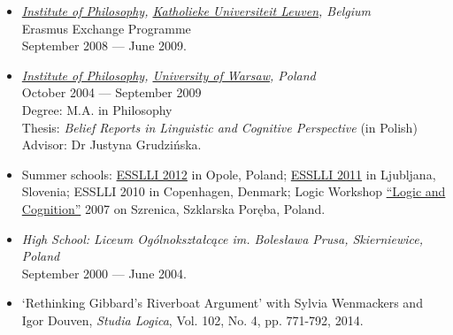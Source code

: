 \documentclass[a4paper,12pt]{article}
\begin{document}
\begin{small}
  
  \begin{itemize}

  \item \emph{\href{http://hiw.kuleuven.be/eng/}{Institute of Philosophy}, \href{http://www.kuleuven.be}{Katholieke Universiteit Leuven}, Belgium}\\
    Erasmus Exchange Programme\\
    September 2008 --- June 2009.
    
  \item \emph{\href{http://www.filozofia.uw.edu.pl}{Institute of
        Philosophy}, \href{http://www.uw.edu.pl}{University of Warsaw}, Poland}\\
    October 2004 --- September 2009\\
    Degree: M.A. in Philosophy\\
    Thesis: \emph{Belief Reports in Linguistic and Cognitive
      Perspective} (in Polish)\\
    Advisor: Dr Justyna Grudzińska.
    


  \item Summer schools: %
    \href{http://www.esslli2012.pl}{ESSLLI 2012} in Opole, Poland;
    \href{http://esslli2011.ijs.si}{ESSLLI 2011} in Ljubljana,
    Slovenia;
    ESSLLI 2010 in Copenhagen, Denmark;
    Logic Workshop
    \href{http://www.logika.uw.edu.pl/warsztaty2007/index.html}{``Logic
      and Cognition''} 2007 on Szrenica, Szklarska Poręba, Poland.

  \item \emph{High School: Liceum Ogólnokształcące im. Bolesława
      Prusa, Skierniewice, Poland}\\
    September 2000 --- June 2004.

  \end{itemize}


  \begin{itemize}
    \item `Rethinking Gibbard's Riverboat Argument' with Sylvia
    Wenmackers and Igor Douven, \emph{Studia Logica}, Vol. 102,
No. 4, pp. 771-792, 2014.


\end{itemize}
\end{small}
\end{document}
